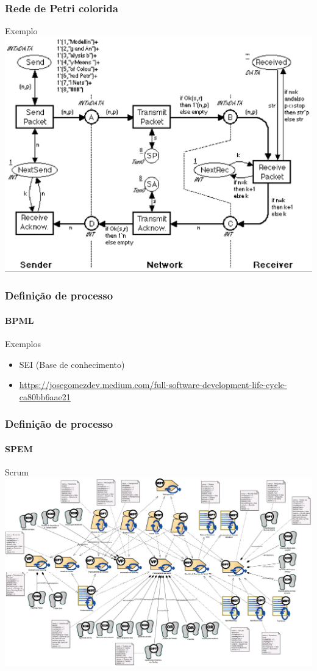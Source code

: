 \begin{frame}
	\frametitle{Rede de Petri colorida}
	
	\begin{block:ie}{Exemplo}
		\centering
		\includegraphics[width=.85\textwidth]{software-engineering/petri-net/cpn-example-network_protocol}
	\end{block:ie}
\end{frame}



\begin{frame}
	\frametitle{Definição de processo}
	\framesubtitle{BPML}
	
	
	
	\begin{block:fact}{Exemplos}
		\begin{itemize}
			\item SEI (Base de conhecimento)
			
			\item \url{https://josegomezdev.medium.com/full-software-development-life-cycle-ca80bb6aae21}
		\end{itemize}
	\end{block:fact}
\end{frame}


\begin{frame}
	\frametitle{Definição de processo}
	\framesubtitle{SPEM}
	
	
	
	\begin{block:fact}{Scrum}
		\includegraphics[width=\textwidth]{scrumsprl}
	\end{block:fact}
\end{frame}



